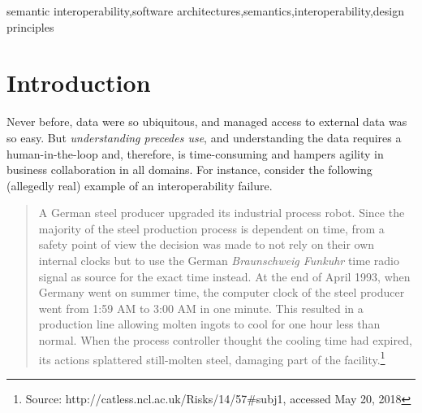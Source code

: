 \documentclass[sort&compress,preprint,authoryear,3p,twocolumn]{elsarticle}
\begin{document}
\begin{frontmatter}


\begin{keyword}
semantic interoperability\sep software
architectures\sep semantics\sep interoperability\sep design principles
\end{keyword}

\end{frontmatter}

\linenumbers



\hypertarget{introduction}{%
\section{Introduction}\label{introduction}}

Never before, data were so ubiquitous, and managed access to external
data was so easy. But \emph{understanding precedes use}, and
understanding the data requires a human-in-the-loop and, therefore, is
time-consuming and hampers agility in business collaboration in all
domains. For instance, consider the following (allegedly real) example
of an interoperability failure.

\begin{quote}
A German steel producer upgraded its industrial process robot. Since the
majority of the steel production process is dependent on time, from a
safety point of view the decision was made to not rely on their own
internal clocks but to use the German \emph{Braunschweig Funkuhr} time
radio signal as source for the exact time instead. At the end of April
1993, when Germany went on summer time, the computer clock of the steel
producer went from 1:59 AM to 3:00 AM in one minute. This resulted in a
production line allowing molten ingots to cool for one hour less than
normal. When the process controller thought the cooling time had
expired, its actions splattered still-molten steel, damaging part of the
facility.\footnote{Source: http://catless.ncl.ac.uk/Risks/14/57\#subj1,
  accessed May 20, 2018}
\end{quote}
\end{document}
